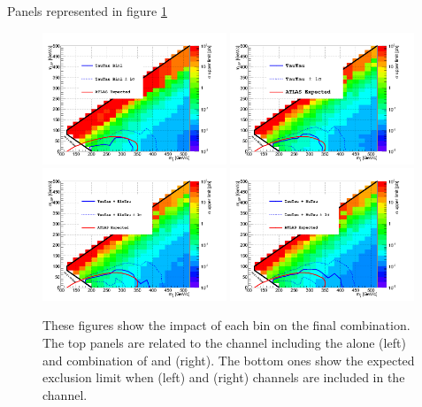 Panels represented in figure \ref{fig:limit_bins}
\begin{linenomath}
\begin{figure}[h]
\centering
\includegraphics[width=0.49\textwidth,keepaspectratio=true]{StatisticsFig/Exclusion_TauTauBin1.png}
\includegraphics[width=0.49\textwidth,keepaspectratio=true]{StatisticsFig/Exclusion_TauTauBin1_Bin2.png}
\includegraphics[width=0.49\textwidth,keepaspectratio=true]{StatisticsFig/Exclusion4Bins_MuTauExcl.png}
\includegraphics[width=0.49\textwidth,keepaspectratio=true]{StatisticsFig/Exclusion4Bins_EleTauExcl.png}
\caption{These figures show the impact of each bin on the final combination. 
The top panels are related to the \tauTau channel including the \binone alone (left) and combination of \binone and \bintwo (right).
The bottom ones show the expected exclusion limit when \eTau (left) and \muTau (right) channels are included in the \tauTau channel.
}
\label{fig:limit_bins}
\end{figure}
\end{linenomath}

